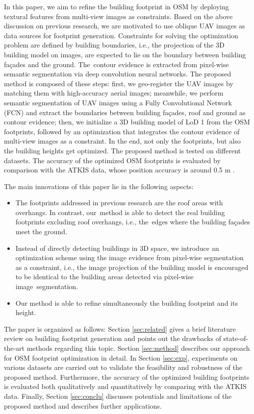 In this paper, we aim to refine the building footprint in OSM by deploying textural features from multi-view images as constraints. Based on the above discussion on previous research, we are motivated to use oblique UAV images as data sources for footprint generation. Constraints for solving the optimization problem are defined by building boundaries, i.e., the projection of the 3D building model on images, are expected to lie on the boundary between building fa\c{c}ades and the ground. The~contour evidence is extracted from pixel-wise semantic segmentation via deep convolution neural networks. The proposed method is composed of these steps: first, we geo-register the UAV images by matching them with high-accuracy aerial images; meanwhile, we perform semantic segmentation of UAV images using a Fully Convolutional Network (FCN) and extract the boundaries between building fa\c{c}ades, roof and ground as contour evidence; then, we initialize a 3D building model of LoD 1 
from the OSM footprints, followed by an optimization that integrates the contour evidence of multi-view images as a constraint. In the end, not only the footprints, but also the building heights get optimized. The proposed method is tested on different datasets. The accuracy of the optimized OSM footprints is evaluated by comparison with the ATKIS 
data, whose position accuracy is around 0.5 m \cite{muller1998quality}. 


The main innovations of this paper lie in the following aspects:
\begin{itemize}[leftmargin=*,labelsep=5.5mm]
\item The footprints addressed in previous research are the roof areas with overhangs. In contrast, our~method is able to detect the real building footprints excluding roof overhangs, i.e., the~edges where the building fa\c{c}ades meet the ground.
\item Instead of directly detecting buildings in 3D space, we introduce an optimization scheme using the image evidence from pixel-wise segmentation as a constraint, i.e., the image projection of the building model is encouraged to be identical to the building areas detected via pixel-wise image~segmentation. 
\item Our method is able to refine simultaneously the building footprint and its height.  
\end{itemize}


The paper is organized as follows: Section \ref{sec:related} gives a brief literature review on building footprint generation and points out the drawbacks of state-of-the-art methods regarding this topic. Section \ref{sec:method} describes our approach for OSM footprint optimization in detail. In Section \ref{sec:exp}, experiments on various datasets are carried out to validate the feasibility and robustness of the proposed method. Furthermore, the accuracy of the optimized building footprints is evaluated both qualitatively and quantitatively by comparing with the ATKIS data. Finally, Section \ref{sec:conclu} discusses potentials and limitations of the proposed method and describes further applications.


